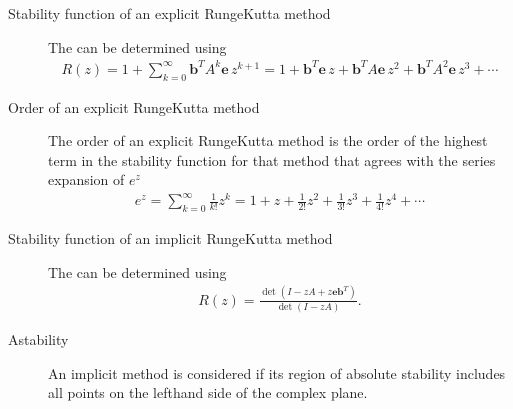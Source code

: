 \documentclass[letterpaper,10pt,english]{jupyterBook}
\begin{document}
\begin{description}
\item[{Stability function of an explicit Runge\sphinxhyphen{}Kutta method\label{\detokenize{8_Appendices/8.0_Cheat_sheet:term-Stability-function-of-an-explicit-Runge-Kutta-method}}}] \leavevmode
\sphinxAtStartPar
The {\hyperref[\detokenize{4_Stability/4.2_RK_stability_function:erk-rz-section}]{}} can be determined using
\begin{align*}
    R(z)=1+\sum_{k=0}^{\infty} \mathbf{b}^T A^k \mathbf{e}\,z^{k+1} =1+\mathbf{b}^T \mathbf{e}\,z+\mathbf{b}^T A\mathbf{e}\,z^2 +\mathbf{b}^T A^2 \mathbf{e}\,z^3 + \cdots
\end{align*}
\item[{Order of an explicit Runge\sphinxhyphen{}Kutta method\label{\detokenize{8_Appendices/8.0_Cheat_sheet:term-Order-of-an-explicit-Runge-Kutta-method}}}] \leavevmode
\sphinxAtStartPar
The order of an explicit Runge\sphinxhyphen{}Kutta method is the order of the highest term in the stability function for that method that agrees with the series expansion of \(e^z\)
\begin{align*}
    e^z = \sum_{k=0}^{\infty} \frac{1}{k!} z^k = 1 + z + \frac{1}{2!}z^2 + \frac{1}{3!}z^3 + \frac{1}{4!}z^4 + \cdots
\end{align*}
\item[{Stability function of an implicit Runge\sphinxhyphen{}Kutta method\label{\detokenize{8_Appendices/8.0_Cheat_sheet:term-Stability-function-of-an-implicit-Runge-Kutta-method}}}] \leavevmode
\sphinxAtStartPar
The {\hyperref[\detokenize{4_Stability/4.3_IRK_stability_function:implicit-rz-section}]{}} can be determined using
\begin{align*}
    R(z) = \frac{\det (I - zA + z\mathbf{e}\mathbf{b}^T)}{\det(I - zA)}.
\end{align*}
\item[{A\sphinxhyphen{}stability\label{\detokenize{8_Appendices/8.0_Cheat_sheet:term-A-stability}}}] \leavevmode
\sphinxAtStartPar
An implicit method is considered {\hyperref[\detokenize{4_Stability/4.3_IRK_stability_function:a-stability}]{}} if its region of absolute stability includes all points on the left\sphinxhyphen{}hand side of the complex plane.


\end{description}
\end{document}
